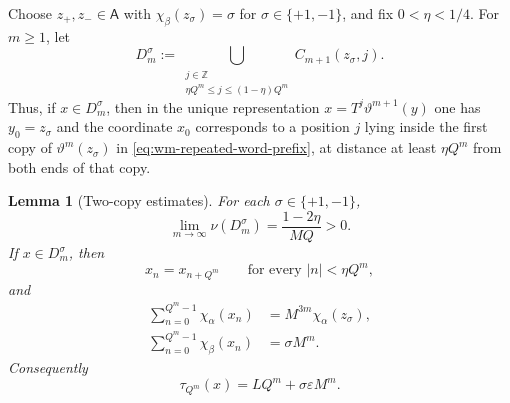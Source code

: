 \documentclass[11pt,reqno,a4paper]{amsart}
\numberwithin{equation}{section}
\theoremstyle{compact}
\newtheorem{lemma}[lemma]{Lemma}
\theoremstyle{definition}
\theoremstyle{definition}
\begin{document}
Choose $z_+,z_-\in\mathsf A$ with
$\chi_\beta(z_\sigma)=\sigma$ for $\sigma\in\{+1,-1\}$, and fix
$0<\eta<1/4$.  For $m\geq1$, let
\begin{equation}\label{eq:wm-repeated-word-set}
  D_m^\sigma
  :=\bigcup_{\substack{j\in\mathbb Z\\
          \eta Q^m\leq j\leq(1-\eta)Q^m}}
     C_{m+1}(z_\sigma,j).
\end{equation}
Thus, if $x\in D_m^\sigma$, then in the unique representation
$x=T^j\vartheta^{m+1}(y)$ one has $y_0=z_\sigma$ and the coordinate $x_0$
corresponds to a position $j$ lying inside the first copy of
$\vartheta^m(z_\sigma)$ in \eqref{eq:wm-repeated-word-prefix}, at distance
at least $\eta Q^m$ from both ends of that copy.

\begin{lemma}[Two-copy estimates]
\label{lem:wm-repeated-word-estimates}
For each $\sigma\in\{+1,-1\}$,
\begin{equation}\label{eq:wm-repeated-word-measure}
  \lim_{m\to\infty}\nu(D_m^\sigma)
  =\frac{1-2\eta}{MQ}>0.
\end{equation}
If $x\in D_m^\sigma$, then
\begin{equation}\label{eq:wm-coordinate-agreement}
  x_n=x_{n+Q^m}
  \qquad\text{for every }|n|<\eta Q^m,
\end{equation}
and
\begin{align}
  \sum_{n=0}^{Q^m-1}\chi_\alpha(x_n)
  &=M^{3m}\chi_\alpha(z_\sigma),
  \label{eq:wm-repeated-alpha-sum}\\
  \sum_{n=0}^{Q^m-1}\chi_\beta(x_n)
  &=\sigma M^m.
  \label{eq:wm-repeated-beta-sum}
\end{align}
Consequently
\begin{equation}\label{eq:wm-repeated-return-time}
  \tau_{Q^m}(x)=LQ^m+\sigma\varepsilon M^m.
\end{equation}
\end{lemma}
\end{document}
